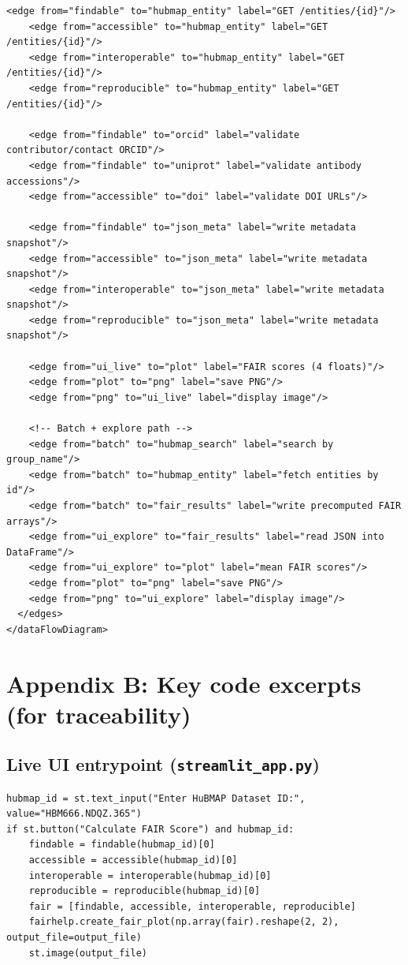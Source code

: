 \documentclass[11pt]{article}
\begin{document}
\begin{lstlisting}[style=xml,caption={XML data flow model capturing the system nodes and edges.}]
    <edge from="findable" to="hubmap_entity" label="GET /entities/{id}"/>
    <edge from="accessible" to="hubmap_entity" label="GET /entities/{id}"/>
    <edge from="interoperable" to="hubmap_entity" label="GET /entities/{id}"/>
    <edge from="reproducible" to="hubmap_entity" label="GET /entities/{id}"/>

    <edge from="findable" to="orcid" label="validate contributor/contact ORCID"/>
    <edge from="findable" to="uniprot" label="validate antibody accessions"/>
    <edge from="accessible" to="doi" label="validate DOI URLs"/>

    <edge from="findable" to="json_meta" label="write metadata snapshot"/>
    <edge from="accessible" to="json_meta" label="write metadata snapshot"/>
    <edge from="interoperable" to="json_meta" label="write metadata snapshot"/>
    <edge from="reproducible" to="json_meta" label="write metadata snapshot"/>

    <edge from="ui_live" to="plot" label="FAIR scores (4 floats)"/>
    <edge from="plot" to="png" label="save PNG"/>
    <edge from="png" to="ui_live" label="display image"/>

    <!-- Batch + explore path -->
    <edge from="batch" to="hubmap_search" label="search by group_name"/>
    <edge from="batch" to="hubmap_entity" label="fetch entities by id"/>
    <edge from="batch" to="fair_results" label="write precomputed FAIR arrays"/>
    <edge from="ui_explore" to="fair_results" label="read JSON into DataFrame"/>
    <edge from="ui_explore" to="plot" label="mean FAIR scores"/>
    <edge from="plot" to="png" label="save PNG"/>
    <edge from="png" to="ui_explore" label="display image"/>
  </edges>
</dataFlowDiagram>
\end{lstlisting}

\section{Appendix B: Key code excerpts (for traceability)}
\subsection{Live UI entrypoint (\texttt{streamlit\_app.py})}
\begin{lstlisting}[style=python]
hubmap_id = st.text_input("Enter HuBMAP Dataset ID:", value="HBM666.NDQZ.365")
if st.button("Calculate FAIR Score") and hubmap_id:
    findable = findable(hubmap_id)[0]
    accessible = accessible(hubmap_id)[0]
    interoperable = interoperable(hubmap_id)[0]
    reproducible = reproducible(hubmap_id)[0]
    fair = [findable, accessible, interoperable, reproducible]
    fairhelp.create_fair_plot(np.array(fair).reshape(2, 2), output_file=output_file)
    st.image(output_file)
\end{lstlisting}
\end{document}
